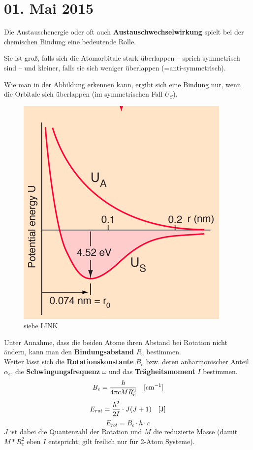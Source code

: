 \section{01. Mai 2015}
\label{q:1}

Die Austauschenergie oder oft auch \textbf{Austauschwechselwirkung} spielt bei der chemischen Bindung eine bedeutende Rolle.

Sie ist groß, falls sich die Atomorbitale stark überlappen -- sprich symmetrisch sind -- und kleiner, falls sie sich weniger überlappen (=anti-symmetrisch).

Wie man in der Abbildung erkennen kann, ergibt sich eine Bindung nur, wenn die Orbitale sich überlappen (im symmetrischen Fall $U_S$).

\begin{figure}[H]  
    \centering
    \includegraphics[width=.4\textwidth]{resources/05-01-2015/Frage1.png}
    \caption{siehe \href{http://hyperphysics.phy-astr.gsu.edu/hbase/molecule/hmol.html}{LINK}}
\end{figure}

\label{q:2}

Unter Annahme, dass die beiden Atome ihren Abstand bei Rotation nicht ändern, kann man den \textbf{Bindungsabstand} $R_e$ bestimmen. \\
Weiter lässt sich die \textbf{Rotationskonstante} $B_e$ bzw. deren anharmonischer Anteil $\alpha_e$, die \textbf{Schwingungsfrequenz} $\omega$ und das \textbf{Trägheitsmoment} $I$ bestimmen. \\

\[B_e = \frac{\hbar}{4 \pi c M R_e^2}\text{\quad [cm$^{-1}$]}\]
\[E_{rot} = \frac{\hbar^2}{2 I} \cdot J(J+1)\text{\quad [J]}\]
\[E_{rot} = B_e \cdot h\cdot c\]
$J$ ist dabei die Quantenzahl der Rotation und $M$ die reduzierte Masse (damit $M * R_e^2$ eben $I$ entspricht; gilt freilich nur für 2-Atom Systeme). \\

